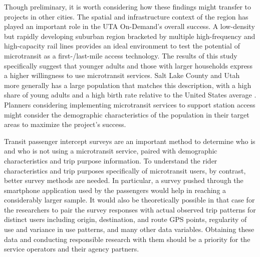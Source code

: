 \documentclass[smartcities,article,submit,moreauthors,pdftex]{Definitions/mdpi}
\begin{document}
Though preliminary, it is worth considering how these findings might transfer to projects in other cities. The spatial and infrastructure context of the region has played an important role in the UTA On-Demand’s overall success. A low-density but rapidly developing suburban region bracketed by multiple high-frequency and high-capacity rail lines provides an ideal environment to test the potential of microtransit as a first-/last-mile access technology. The results of this study specifically suggest that younger adults and those with larger households express a higher willingness to use microtransit services. Salt Lake County and Utah more generally has a large population that matches this description, with a high share of young adults and a high birth rate relative to the United States average \citep{utahHealth}. Planners considering implementing microtransit services to support station access might consider the demographic characteristics of the population in their target areas to maximize the project’s success.

Transit passenger intercept surveys are an important method to determine who is and who is not using a microtransit service, paired with demographic characteristics and trip purpose information. To understand the rider characteristics and trip purposes specifically of microtransit users, by contrast, better survey methods are needed. In particular, a survey pushed through the smartphone application used by the passengers would help in reaching a considerably larger sample. It would also be theoretically possible in that case for the researchers to pair the survey responses with actual observed trip patterns for distinct users including origin, destination, and route GPS points, regularity of use and variance in use patterns, and many other data variables. Obtaining these data and conducting responsible research with them should be a priority for the service operators and their agency partners.


\vspace{6pt}

\end{document}
